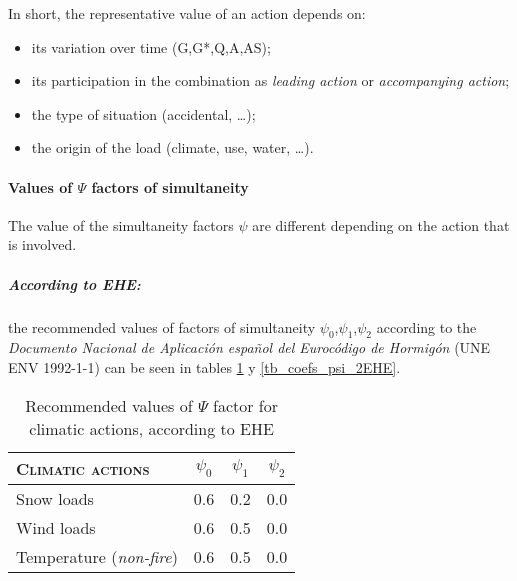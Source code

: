 In short, the representative value of an action depends on:
\begin{itemize}
\item its variation over time (G,G*,Q,A,AS);
\item its participation in the combination as \emph{leading action} or \emph{accompanying action};
\item the type of situation (accidental, \ldots);
\item the origin of the load (climate, use, water, \ldots).
\end{itemize}

\paragraph{Values of $\Psi$ factors of simultaneity}
The value of the simultaneity factors $\psi$ are different depending on the action that is involved.

\subparagraph{According to EHE:} the recommended values of factors of simultaneity  $\psi_{0}$,$\psi_{1}$,$\psi_{2}$ according to the \emph{Documento Nacional de Aplicaci\'{o}n espa\~{n}ol del Euroc\'{o}digo de Hormig\'{o}n} (UNE ENV 1992-1-1) can be seen in tables \ref{tb_coefs_psi_1EHE} y \ref{tb_coefs_psi_2EHE}.

\begin{table}
\begin{center}
\begin{small}
\begin{tabular}{|l|c|c|c|}
\hline
\textsc{Climatic actions} & $\psi_{0}$ & $\psi_{1}$ & $\psi_{2}$ \\
\hline
Snow loads & 0.6 & 0.2 & 0.0 \\
Wind loads & 0.6 & 0.5 & 0.0 \\
Temperature (\emph{non-fire}) & 0.6 & 0.5 & 0.0 \\
\hline
\end{tabular}
\end{small}
\caption{Recommended values of $\Psi$ factor for climatic actions, according to EHE} \label{tb_coefs_psi_1EHE}
\end{center}
\end{table}

